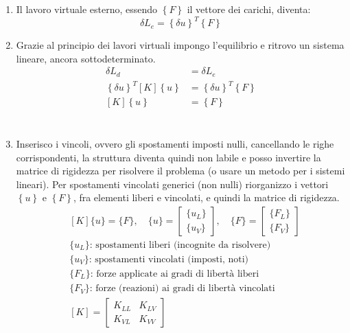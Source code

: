 \begin{enumerate}
    \item Il lavoro virtuale esterno, essendo $\left\{F\right\}$ il vettore dei carichi,  diventa:
    \begin{equation*}
        \delta L_e = \left\{\delta u\right\}^T \left\{F\right\}
    \end{equation*}
    \item Grazie al principio dei lavori virtuali impongo l'equilibrio e ritrovo un sistema lineare, ancora sottodeterminato.
    \begin{align*}
    \delta L_d &= \delta L_e\\
        \left\{\delta u\right\}^T  [K] \left\{ u\right\} &= \left\{\delta u\right\}^T \left\{F\right\}\\
         [K] \left\{ u\right\} &=  \left\{F\right\}\\
    \end{align*}\\
    \item Inserisco i vincoli, ovvero gli spostamenti imposti nulli, cancellando le righe corrispondenti, la struttura diventa quindi non labile e posso invertire la matrice di rigidezza per risolvere il problema (o usare un metodo per i sistemi lineari). Per spostamenti vincolati generici (non nulli) riorganizzo i vettori $\left\{ u\right\}$ e $\left\{F\right\}$, fra elementi liberi e vincolati, e quindi la matrice di rigidezza.
    \begin{align*}
&[K]\{u\} = \{F\}, \quad
\{u\} =
\begin{bmatrix}
\{u_L\}\\[4pt]
\{u_V\}
\end{bmatrix},
\quad
\{F\} =
\begin{bmatrix}
\{F_L\}\\[4pt]
\{F_V\}
\end{bmatrix} \\[6pt]
&\text{\(\{u_L\}\): spostamenti liberi (incognite da risolvere)} \\
&\text{\(\{u_V\}\): spostamenti vincolati (imposti, noti)} \\
&\text{\(\{F_L\}\): forze applicate ai gradi di libertà liberi} \\
&\text{\(\{F_V\}\): forze (reazioni) ai gradi di libertà vincolati} \\[6pt]
&[K] =
\begin{bmatrix}
K_{LL} & K_{LV}\\[4pt]
K_{VL} & K_{VV}
\end{bmatrix} \\[6pt]
\end{align*}

    
\end{enumerate}
